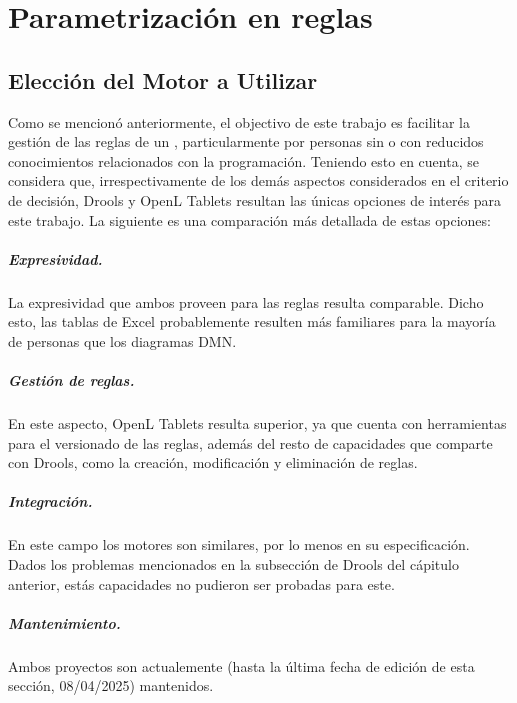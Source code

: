 \chapter{Parametrización en reglas}
\label{chap:solucion}

\section{Elección del Motor a Utilizar}
Como se mencionó anteriormente, el objectivo de este trabajo es facilitar la gestión de las reglas de un \SIOSU, particularmente por personas sin o con reducidos conocimientos relacionados con la programación. Teniendo esto en cuenta, se considera que, irrespectivamente de los demás aspectos considerados en el criterio de decisión, Drools y OpenL Tablets resultan las únicas opciones de interés para este trabajo. La siguiente es una comparación más detallada de estas opciones:

\paragraph{Expresividad.}
La expresividad que ambos proveen para las reglas resulta comparable. Dicho esto, las tablas de Excel probablemente resulten más familiares para la mayoría de personas que los diagramas DMN.

\paragraph{Gestión de reglas.}
En este aspecto, OpenL Tablets resulta superior, ya que cuenta con herramientas para el versionado de las reglas, además del resto de capacidades que comparte con Drools, como la creación, modificación y eliminación de reglas.

\paragraph{Integración.}
En este campo los motores son similares, por lo menos en su especificación. Dados los problemas mencionados en la subsección de Drools del cápitulo anterior, estás capacidades no pudieron ser probadas para este.

\paragraph{Mantenimiento.}
Ambos proyectos son actualemente (hasta la última fecha de edición de esta sección, 08/04/2025) mantenidos.

